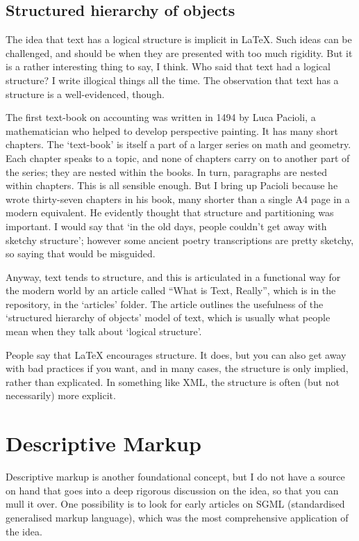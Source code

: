 \documentclass[12pt, oneside]{memoir}
\begin{document}
\subsection*{Structured hierarchy of objects}
The idea that text has a logical structure is implicit in \LaTeX{}. Such ideas can be challenged, and should be when they are presented with too much rigidity. But it is a rather interesting thing to say, I think. Who said that text had a logical structure? I write illogical things all the time. The observation that text has a structure is a well-evidenced, though.

The first text-book on accounting was written in 1494 by Luca Pacioli, a mathematician who helped to develop perspective painting. It has many short chapters. The `text-book' is itself a part of a larger series on math and geometry. Each chapter speaks to a topic, and none of chapters carry on to another part of the series; they are nested within the books. In turn, paragraphs are nested within chapters. This is all sensible enough. But I bring up Pacioli because he wrote thirty-seven chapters in his book, many shorter than a single A4 page in a modern equivalent. He evidently thought that structure and partitioning was important. I would say that `in the old days, people couldn't get away with sketchy structure'; however some ancient poetry transcriptions are pretty sketchy, so saying that would be misguided.

Anyway, text tends to structure, and this is articulated in a functional way for the modern world by an article called ``What is Text, Really'', which is in the repository, in the `articles' folder. The article outlines the usefulness of the `structured hierarchy of objects' model of text, which is usually what people mean when they talk about `logical structure'.

People say that \LaTeX{} encourages structure. It does, but you can also get away with bad practices if you want, and in many cases, the structure is only implied, rather than explicated. In something like XML, the structure is often (but not necessarily) more explicit.

\section*{Descriptive Markup}
Descriptive markup is another foundational concept, but I do not have a source on hand that goes into a deep rigorous discussion on the idea, so that you can mull it over. One possibility is to look for early articles on SGML (standardised generalised markup language), which was the most comprehensive application of the idea.
\end{document}
